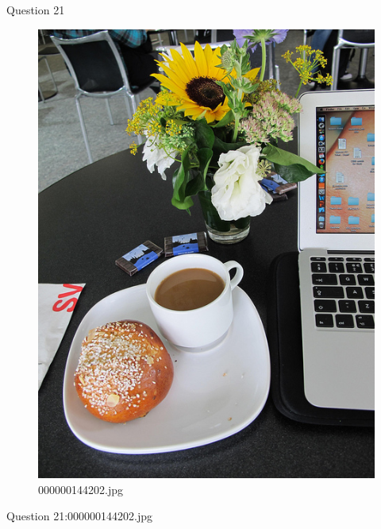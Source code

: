 Question 21
    \begin{figure}[h]
        \centering
        \includegraphics[width=0.8\linewidth]{../image set/easy/000000144202.jpg}
        \caption{000000144202.jpg}
    \end{figure}
    Question 21:000000144202.jpg
